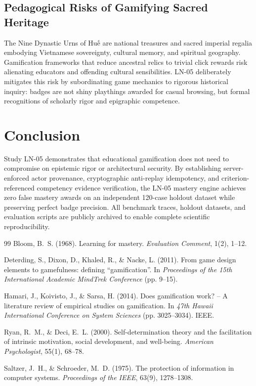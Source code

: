 \documentclass[11pt,a4paper]{article}
\begin{document}
\subsection{Pedagogical Risks of Gamifying Sacred Heritage}
The Nine Dynastic Urns of Huế are national treasures and sacred imperial regalia embodying Vietnamese sovereignty, cultural memory, and spiritual geography. Gamification frameworks that reduce ancestral relics to trivial click rewards risk alienating educators and offending cultural sensibilities. LN-05 deliberately mitigates this risk by subordinating game mechanics to rigorous historical inquiry: badges are not shiny playthings awarded for casual browsing, but formal recognitions of scholarly rigor and epigraphic competence.

\section{Conclusion}

Study LN-05 demonstrates that educational gamification does not need to compromise on epistemic rigor or architectural security. By establishing server-enforced actor provenance, cryptographic anti-replay idempotency, and criterion-referenced competency evidence verification, the LN-05 mastery engine achieves zero false mastery awards on an independent 120-case holdout dataset while preserving perfect badge precision. All benchmark traces, holdout datasets, and evaluation scripts are publicly archived to enable complete scientific reproducibility.

\begin{thebibliography}{99}
Bloom, B.~S. (1968). Learning for mastery. \textit{Evaluation Comment}, 1(2), 1--12.

Deterding, S., Dixon, D., Khaled, R., \& Nacke, L. (2011). From game design elements to gamefulness: defining ``gamification''. In \textit{Proceedings of the 15th International Academic MindTrek Conference} (pp. 9--15).

Hamari, J., Koivisto, J., \& Sarsa, H. (2014). Does gamification work? -- A literature review of empirical studies on gamification. In \textit{47th Hawaii International Conference on System Sciences} (pp. 3025--3034). IEEE.

Ryan, R.~M., \& Deci, E.~L. (2000). Self-determination theory and the facilitation of intrinsic motivation, social development, and well-being. \textit{American Psychologist}, 55(1), 68--78.

Saltzer, J.~H., \& Schroeder, M.~D. (1975). The protection of information in computer systems. \textit{Proceedings of the IEEE}, 63(9), 1278--1308.
\end{thebibliography}
\end{document}

